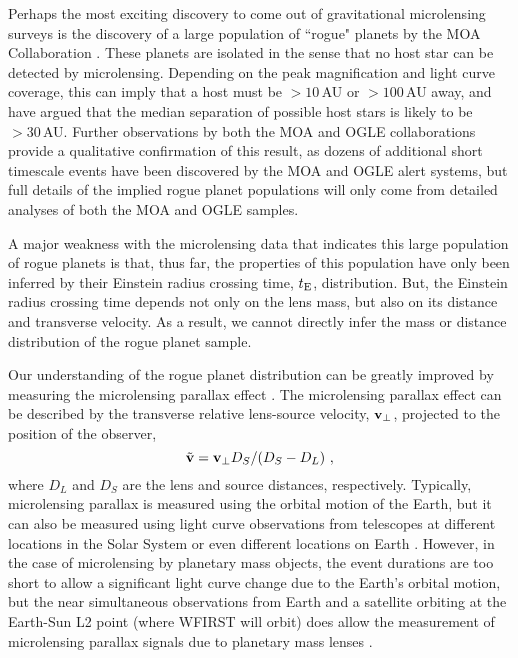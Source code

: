 Perhaps the most exciting discovery to come out of gravitational
microlensing surveys is the discovery of a large population of ``rogue"
planets by the MOA Collaboration \citep{2011Natur.473..349S}. These planets
are isolated in the sense that no host star can be detected
by microlensing. Depending on the peak magnification and light curve
coverage, this can imply that a host must be $> 10\,$AU or $> 100\,$AU away,
and \citet{2012ApJ...757..119B} have argued that the median separation
of possible host stars is likely to be $> 30\,$AU.
Further observations by both the MOA and OGLE collaborations provide
a qualitative confirmation of this result, as dozens of additional
short timescale events have been discovered by the MOA and OGLE
alert systems, but full details of the implied rogue planet
populations  will only come from detailed analyses of both the MOA
and OGLE samples.

A major weakness with the microlensing data that indicates this
large population of rogue planets is that, thus far, the properties
of this population have only been inferred by their Einstein radius
crossing time, $t_{\rm E}$, distribution. But, the Einstein radius crossing
time depends not only on the lens mass, but also on its distance and
transverse velocity. As a result, we cannot directly infer the mass or distance
distribution of the rogue planet sample.

Our understanding of the rogue planet distribution can be greatly improved
by measuring the microlensing parallax effect \citep{1992ApJ...392..442G,1995ApJ...454L.125A}.
The microlensing parallax effect can be described
by the transverse relative lens-source velocity, ${\bf v}_{\rm \perp}$, projected
to the position of the observer,
\begin{equation}
\tilde{\bf v} = {\bf v}_{\rm \perp} D_S/(D_S-D_L) \ , \label{eq-vp}
\end{equation}
where $D_L$ and $D_S$ are the lens and source distances, respectively.
Typically, microlensing parallax
is measured using the orbital motion of the Earth, but it can also be
measured using light curve observations from telescopes at different locations
in the Solar System \citep{2007ApJ...664..862D,2015ApJ...804...20C} or
even different locations on Earth \citep{2009ApJ...698L.147G}. However, in the
case of microlensing by planetary mass objects, the event durations are
too short to allow a significant light curve change due to the Earth's
orbital motion, but the near simultaneous observations from Earth and a
satellite orbiting at the Earth-Sun L2 point (where WFIRST will orbit) does
allow the measurement of microlensing parallax signals due to planetary mass
lenses \citep{2003ApJ...591L..53G}.

